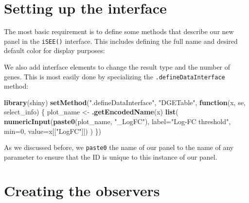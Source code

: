 \documentclass[]{book}
\newenvironment{Shaded}{\begin{snugshade}}{\end{snugshade}}
\newcommand{\KeywordTok}[1]{\textcolor[rgb]{0.13,0.29,0.53}{\textbf{#1}}}
\newcommand{\DataTypeTok}[1]{\textcolor[rgb]{0.13,0.29,0.53}{#1}}
\newcommand{\DecValTok}[1]{\textcolor[rgb]{0.00,0.00,0.81}{#1}}
\newcommand{\StringTok}[1]{\textcolor[rgb]{0.31,0.60,0.02}{#1}}
\newcommand{\ControlFlowTok}[1]{\textcolor[rgb]{0.13,0.29,0.53}{\textbf{#1}}}
\newcommand{\NormalTok}[1]{#1}
\begin{document}
\section{Setting up the interface}\label{setting-up-the-interface-1}

The most basic requirement is to define some methods that describe our
new panel in the \texttt{iSEE()} interface. This includes defining the
full name and desired default color for display purposes:

\begin{Shaded}
\end{Shaded}

We also add interface elements to change the result type and the number
of genes. This is most easily done by specializing the
\texttt{.defineDataInterface} method:

\begin{Shaded}
\begin{Highlighting}[]
\KeywordTok{library}\NormalTok{(shiny)}
\KeywordTok{setMethod}\NormalTok{(}\StringTok{".defineDataInterface"}\NormalTok{, }\StringTok{"DGETable"}\NormalTok{, }\ControlFlowTok{function}\NormalTok{(x, se, select_info) \{}
\NormalTok{    plot_name <-}\StringTok{ }\KeywordTok{.getEncodedName}\NormalTok{(x)}
    \KeywordTok{list}\NormalTok{(}
        \KeywordTok{numericInput}\NormalTok{(}\KeywordTok{paste0}\NormalTok{(plot_name, }\StringTok{"_LogFC"}\NormalTok{), }\DataTypeTok{label=}\StringTok{"Log-FC threshold"}\NormalTok{,}
            \DataTypeTok{min=}\DecValTok{0}\NormalTok{, }\DataTypeTok{value=}\NormalTok{x[[}\StringTok{"LogFC"}\NormalTok{]])}
\NormalTok{    )}
\NormalTok{\})}
\end{Highlighting}
\end{Shaded}

As we discussed before, we \texttt{paste0} the name of our panel to the
name of any parameter to ensure that the ID is unique to this instance
of our panel.

\section{Creating the observers}\label{creating-the-observers-1}
\end{document}
